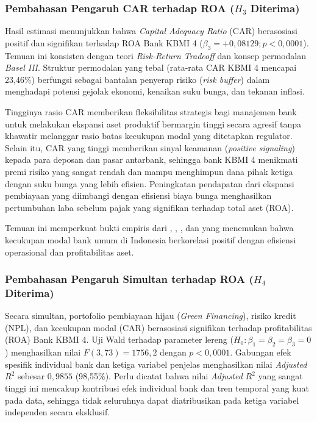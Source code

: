 \documentclass[12pt,a4paper]{article}
\numberwithin{equation}{section}
\begin{document}
\subsubsection{Pembahasan Pengaruh CAR terhadap ROA \texorpdfstring{($H_3$ Diterima)}{(H3 Diterima)}}
\noindent
Hasil estimasi menunjukkan bahwa \emph{Capital Adequacy Ratio} (CAR) berasosiasi positif dan signifikan terhadap ROA Bank KBMI 4 ($\beta_3 = +0{,}08129; p < 0{,}0001$). Temuan ini konsisten dengan teori \emph{Risk-Return Tradeoff} \citep{BrighamEhrhardt2020} dan konsep permodalan \emph{Basel III}. Struktur permodalan yang tebal (rata-rata CAR KBMI 4 mencapai 23,46\%) berfungsi sebagai bantalan penyerap risiko (\emph{risk buffer}) dalam menghadapi potensi gejolak ekonomi, kenaikan suku bunga, dan tekanan inflasi.

\noindent
Tingginya rasio CAR memberikan fleksibilitas strategis bagi manajemen bank untuk melakukan ekspansi aset produktif bermargin tinggi secara agresif tanpa khawatir melanggar rasio batas kecukupan modal yang ditetapkan regulator. Selain itu, CAR yang tinggi memberikan sinyal keamanan (\emph{positive signaling}) kepada para deposan dan pasar antarbank, sehingga bank KBMI 4 menikmati premi risiko yang sangat rendah dan mampu menghimpun dana pihak ketiga dengan suku bunga yang lebih efisien. Peningkatan pendapatan dari ekspansi pembiayaan yang diimbangi dengan efisiensi biaya bunga menghasilkan pertumbuhan laba sebelum pajak yang signifikan terhadap total aset (ROA).

\noindent
Temuan ini memperkuat bukti empiris dari \citet{LestariPurnomo2023}, \citet{NugrohoUtami2021}, \citet{Pramono2022}, dan \citet{HaryantoSudarno2023} yang menemukan bahwa kecukupan modal bank umum di Indonesia berkorelasi positif dengan efisiensi operasional dan profitabilitas aset.

\subsubsection{Pembahasan Pengaruh Simultan terhadap ROA \texorpdfstring{($H_4$ Diterima)}{(H4 Diterima)}}
\noindent
Secara simultan, portofolio pembiayaan hijau (\emph{Green Financing}), risiko kredit (NPL), dan kecukupan modal (CAR) berasosiasi signifikan terhadap profitabilitas (ROA) Bank KBMI 4. Uji Wald terhadap parameter lereng ($H_0: \beta_1 = \beta_2 = \beta_3 = 0$) menghasilkan nilai $F(3, 73) = 1756{,}2$ dengan $p < 0{,}0001$. Gabungan efek spesifik individual bank dan ketiga variabel penjelas menghasilkan nilai \emph{Adjusted} $R^2$ sebesar $0{,}9855$ (98,55\%). Perlu dicatat bahwa nilai \emph{Adjusted} $R^2$ yang sangat tinggi ini mencakup kontribusi efek individual bank dan tren temporal yang kuat pada data, sehingga tidak seluruhnya dapat diatribusikan pada ketiga variabel independen secara eksklusif.
\end{document}
